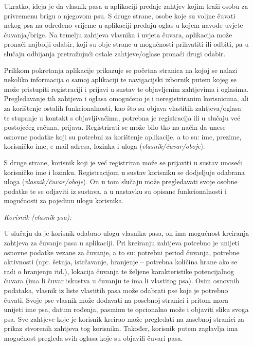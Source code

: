 		Ukratko, ideja je da vlasnik pasa u aplikaciji predaje zahtjev kojim traži osobu za privremenu brigu o njegovom psu. S druge strane, osobe koje su voljne čuvati nekog psa na određeno vrijeme u aplikaciji predaju oglas u kojem navode uvjete čuvanja/brige. Na temelju zahtjeva vlasnika i uvjeta čuvara, aplikacija može pronaći najbolji odabir, koji su obje strane u mogućnosti prihvatiti ili odbiti, pa u slučaju odbijanja pretražujući  ostale zahtjeve/oglase pronaći drugi odabir. 
		
		Prilikom pokretanja aplikacije prikazuje se početna stranica na kojoj se nalazi nekoliko informacija o samoj aplikaciji te navigacijski izbornik putem kojeg se može pristupiti registraciji i prijavi u sustav te objavljenim zahtjevima i oglasima. Pregledavanje tih zahtjeva i oglasa omogućeno je i neregistriranim korisnicima, ali za korištenje ostalih funkcionalnosti, kao što su objava vlastitih zahtjeva/oglasa te stupanje u kontakt s objavljivačima, potrebna je registracija ili u slučaju već postojećeg računa, prijava. Registrirati se može bilo tko na način da unese osnovne podatke koji su potrebni za korištenje aplikacije, a to su: ime, prezime, korisničko ime, e-mail adresa, lozinka i uloga (\textit{vlasnik/čuvar/oboje}). 
		
		S druge strane, korisnik koji je već registriran može se prijaviti u sustav unoseći korisničko ime i lozinku. Registracijom u sustav korisniku se dodjeljuje odabrana uloga (\textit{vlasnik/čuvar/oboje}). On u tom slučaju može pregledavati svoje osobne podatke te se odjaviti iz sustava, a u nastavku su opisane funkcionalnosti i mogućnosti za pojedinu ulogu korisnika. 
		
		\textit{Korisnik (vlasnik psa):}
		
		U slučaju da je korisnik odabrao ulogu vlasnika pasa, on ima mogućnost kreiranja zahtjeva za čuvanje pasa u aplikaciji. Pri kreiranju zahtjeva potrebno je unijeti osnovne podatke vezane za čuvanje, a to su: potrebni period čuvanja, potrebne aktivnosti (npr. šetnja, istrčavanje, hranjenje – potrebna količina hrane ako se radi o hranjenju itd.), lokacija čuvanja te željene karakteristike potencijalnog čuvara (ima li čuvar iskustva u čuvanju te ima li vlastitog psa). Osim osnovnih podataka, vlasnik iz liste vlastitih pasa može odabrati pse koje je potrebno čuvati. Svoje pse vlasnik može dodavati na posebnoj stranici i pritom mora unijeti ime psa, datum rođenja, pasminu te opcionalno može i objaviti sliku svoga psa. Sve zahtjeve koje je korisnik kreirao može pregledati na zasebnoj stranici za prikaz stvorenih zahtjeva tog korisnika. Također, korisnik putem zaglavlja ima mogućnost pregleda svih oglasa koje su objavili čuvari pasa.
		
